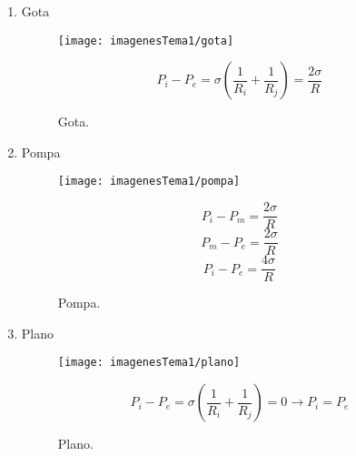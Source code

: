 \begin{enumerate}
\begin{itemize}
\begin{enumerate}
\begin{figure}[H]
\begin{minipage}{0.3\textwidth}
			\end{minipage}
			\end{figure}
			
			\item Gota
			
			\begin{figure}[H]
				\begin{minipage}{0.4\textwidth}
				\centering
				\texttt{[image: imagenesTema1/gota]}
				\caption{Gota.}
				\label{fig:gota}
					\end{minipage}%
				\begin{minipage}{0.3\textwidth}
				\[P_i - P_e =\sigma\left(\frac{1}{R_i}+\frac{1}{R_j}\right)=\frac{2\sigma}{R}\]
				
				\end{minipage}
				
			\end{figure}
			
			\item Pompa
			
			\begin{figure}[H]
				\begin{minipage}{0.4\textwidth}
				\centering
				\texttt{[image: imagenesTema1/pompa]}
				\caption{Pompa.}
				\label{fig:pompa}
			\end{minipage}%
			\begin{minipage}{0.3\textwidth}
			\[P_i - P_m =\frac{2\sigma}{R}\]
			\[P_m - P_e =\frac{2\sigma}{R}\]
			\[P_i - P_e =\frac{4\sigma}{R}\]
			
			\end{minipage}
			\end{figure}
			
			\item Plano
			
			\begin{figure}[H]
								\begin{minipage}{0.4\textwidth}
				\centering
				\texttt{[image: imagenesTema1/plano]}
				\caption{Plano.}
				\label{fig:plano}
			\end{minipage}%
			\begin{minipage}{0.3\textwidth}
			\[P_i - P_e =\sigma\left(\frac{1}{R_i}+\frac{1}{R_j}\right)=0\rightarrow P_i = P_e\]
			
			\end{minipage}
			\end{figure}
			
		\end{enumerate}
	\end{itemize}
\end{enumerate}

